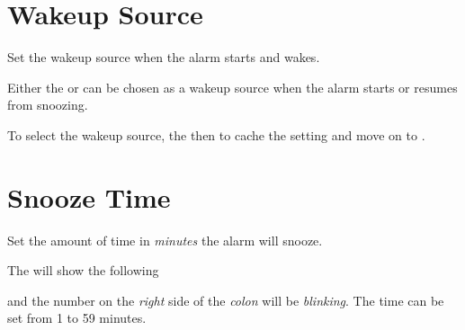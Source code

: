 \section{Wakeup Source} 

Set the wakeup source when the alarm starts and wakes.

\par\medskip

Either the  or  can be chosen as a wakeup source when the alarm
starts or resumes from snoozing. 


To select the wakeup source,  the  then 
to cache the setting and move on to .


\section{Snooze Time} 

Set the amount of time in \textit{minutes} the alarm will snooze.

\par\medskip

The  will show the following


and the number on the \textit{right} side of the \textit{colon} will be
\textit{blinking}.  The time can be set from \num{1} to \num{59} minutes.

\par\medskip


